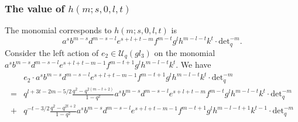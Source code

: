 \documentclass[table,a4paper,reqno]{amsart}
\numberwithin{equation}{section}
\theoremstyle{definition}
\begin{document}
\subsubsection{The value of $h(m;s,0,l,t)$}
The monomial corresponds to $h(m;s,0,l,t)$ is
\begin{equation}
    a^{s}b^{m-s}d^{m-s-l}e^{s+l+t-m}f^{m-t}g^{l}h^{m-l-t}k^{t}\cdot\text{det}_q^{-m}.
\end{equation}
Consider the left action of $e_2\in\mathcal{U}_q(gl_3)$ on the monomial\\ $a^{s}b^{m-s}d^{m-s-l}e^{s+l+t-m-1}f^{m-t+1}g^{l}h^{m-l-t}k^{t}$. We have
\begin{equation}\label{eq:4.65}
    \begin{split}
        &e_2\cdot a^{s}b^{m-s}d^{m-s-l}e^{s+l+t-m-1}f^{m-t+1}g^{l}h^{m-l-t}k^{t}\cdot\text{det}_q^{-m}\\
        =&q^{l+3t-2m-5/2}\frac{q^2-q^{2(m-t+2)}}{1-q^2}a^{s}b^{m-s}d^{m-s-l}e^{s+l+t-m}f^{m-t}g^{l}h^{m-l-t}k^{t}\cdot\text{det}_q^{-m}\\
        +&q^{-t-3/2}\frac{q^2-q^{2t+2}}{1-q^2}a^{s}b^{m-s}d^{m-s-l}e^{s+l+t-m-1}f^{m-t+1}g^{l}h^{m-l-t+1}k^{t-1}\cdot\text{det}_q^{-m}\\
    \end{split}
\end{equation}
\end{document}
